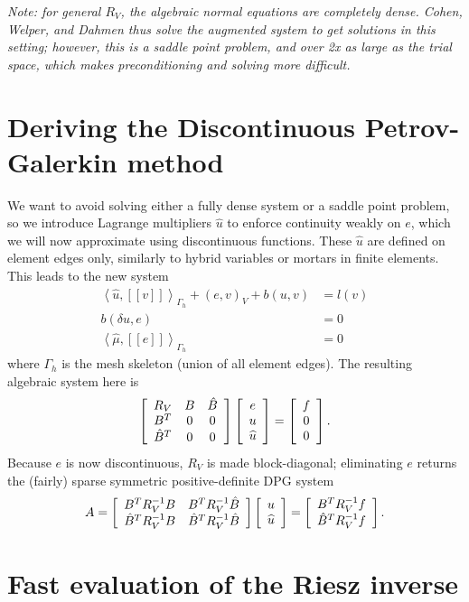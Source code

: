 \documentclass{article}
\newcommand{\LRs}[1]{\left[ #1 \right]}
\newcommand{\LRa}[1]{\left\langle #1 \right\rangle}
\newcommand{\jump}[1] {\ensuremath{\LRs{\![#1]\!}}}
\newcommand{\uh}{\widehat{u}}
\newcommand{\Gh}{\Gamma_h}
\def\vecttwo#1#2{\left[
\begin{array}{c}
#1\\
#2\\
\end{array}
\right]}
\begin{document}
\emph{Note: for general $R_V$, the algebraic normal equations are completely dense.  Cohen, Welper, and Dahmen thus solve the augmented system to get solutions in this setting; however, this is a saddle point problem, and over 2x as large as the trial space, which makes preconditioning and solving more difficult. }

\section{Deriving the Discontinuous Petrov-Galerkin method}

We want to avoid solving either a fully dense system or a saddle point problem, so we introduce Lagrange multipliers $\uh$ to enforce continuity weakly on $e$, which we will now approximate using discontinuous functions.  These $\uh$ are defined on element edges only, similarly to hybrid variables or mortars in finite elements.  This leads to the new system 
\begin{align*}
\LRa{\uh, \jump{v}}_{\Gh} + (e,v)_V + b(u,v) &= l(v) \\
b(\delta u,e) &= 0\\
\LRa{\hat{\mu}, \jump{e}}_{\Gh} &= 0
\end{align*}
where $\Gh$ is the mesh skeleton (union of all element edges).  The resulting algebraic system here is 
\[
\left[
\begin{array}{c c c}
R_V & B& \hat{B}\\
B^T & 0& 0\\
\hat{B}^T & 0& 0
\end{array}
\right]
\left[\begin{array}{c}
e \\ u\\ \uh
\end{array}
\right]
= 
\left[\begin{array}{c}
f\\0\\0
\end{array}
\right].
\]
Because $e$ is now discontinuous, $R_V$ is made block-diagonal; eliminating $e$ returns the (fairly) sparse symmetric positive-definite DPG system
\[
A = \left[\begin{array}{c c}
B^TR_V^{-1}B & B^TR_V^{-1}\hat{B}\\
\hat{B}^TR_V^{-1}B & \hat{B}^TR_V^{-1}\hat{B}
\end{array}\right]
\vecttwo{u}{\uh} = \vecttwo{B^TR_V^{-1} f}{\hat{B}^TR_V^{-1}f}.
\]

\section{Fast evaluation of the Riesz inverse}
\end{document}
